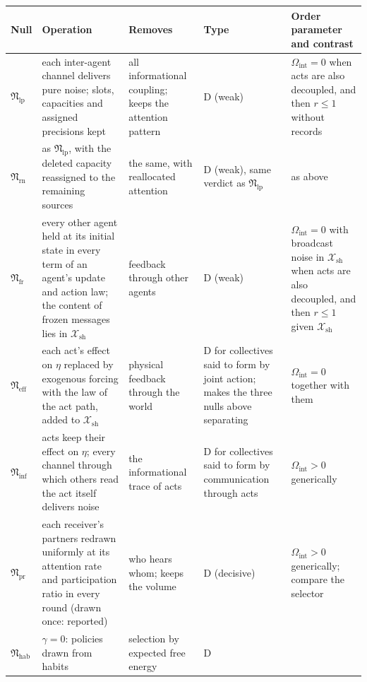 \begin{table}[tbp]
\centering
\small
\setlength{\tabcolsep}{4pt}
\begin{tabular}{@{}>{\raggedright\arraybackslash}p{1.25cm}>{\raggedright\arraybackslash}p{4.5cm}>{\raggedright\arraybackslash}p{3.3cm}>{\raggedright\arraybackslash}p{2.7cm}>{\raggedright\arraybackslash}p{3.6cm}@{}}
\toprule
Null & Operation & Removes & Type & Order parameter and contrast \\
\midrule
$\mathfrak N_{\mathrm{lp}}$ & each inter-agent channel delivers pure noise; slots, capacities and assigned precisions kept & all informational coupling; keeps the attention pattern & D (weak) & $\Omega_{\mathrm{int}}=0$ when acts are also decoupled, and then $r\le1$ without records \\
$\mathfrak N_{\mathrm{rn}}$ & as $\mathfrak N_{\mathrm{lp}}$, with the deleted capacity reassigned to the remaining sources & the same, with reallocated attention & D (weak), same verdict as $\mathfrak N_{\mathrm{lp}}$ & as above \\
$\mathfrak N_{\mathrm{fr}}$ & every other agent held at its initial state in every term of an agent's update and action law; the content of frozen messages lies in $\mathcal X_{\mathrm{sh}}$ & feedback through other agents & D (weak) & $\Omega_{\mathrm{int}}=0$ with broadcast noise in $\mathcal X_{\mathrm{sh}}$ when acts are also decoupled, and then $r\le1$ given $\mathcal X_{\mathrm{sh}}$ \\
$\mathfrak N_{\mathrm{eff}}$ & each act's effect on $\eta$ replaced by exogenous forcing with the law of the act path, added to $\mathcal X_{\mathrm{sh}}$ & physical feedback through the world & D for collectives said to form by joint action; makes the three nulls above separating & $\Omega_{\mathrm{int}}=0$ together with them \\
$\mathfrak N_{\mathrm{inf}}$ & acts keep their effect on $\eta$; every channel through which others read the act itself delivers noise & the informational trace of acts & D for collectives said to form by communication through acts & $\Omega_{\mathrm{int}}>0$ generically \\
$\mathfrak N_{\mathrm{pr}}$ & each receiver's partners redrawn uniformly at its attention rate and participation ratio in every round (drawn once: reported) & who hears whom; keeps the volume & D (decisive) & $\Omega_{\mathrm{int}}>0$ generically; compare the selector \\
$\mathfrak N_{\mathrm{hab}}$ & $\gamma=0$: policies drawn from habits & selection by expected free energy & D & \\

\end{tabular}
\end{table}
